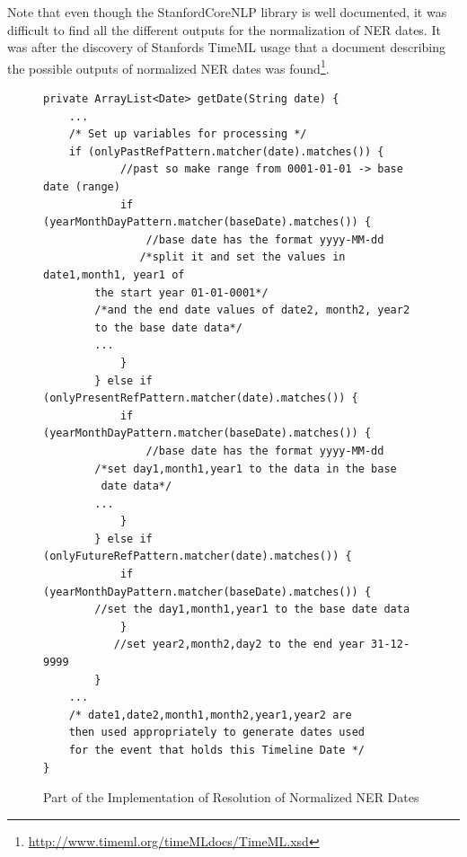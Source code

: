 \par Note that even though the StanfordCoreNLP library is well documented, it was difficult to find all the different outputs for the normalization of NER dates. It was after the discovery of Stanfords TimeML usage that a document describing the possible outputs of normalized NER dates was found\footnote{\url{http://www.timeml.org/timeMLdocs/TimeML.xsd}}. 

\begin{figure}[H]
\begin{lstlisting}
private ArrayList<Date> getDate(String date) {
	...
	/* Set up variables for processing */
	if (onlyPastRefPattern.matcher(date).matches()) {
            //past so make range from 0001-01-01 -> base date (range)
            if (yearMonthDayPattern.matcher(baseDate).matches()) {
                //base date has the format yyyy-MM-dd
               /*split it and set the values in date1,month1, year1 of 
		the start year 01-01-0001*/
		/*and the end date values of date2, month2, year2 
		to the base date data*/
		...
            }
        } else if (onlyPresentRefPattern.matcher(date).matches()) {
            if (yearMonthDayPattern.matcher(baseDate).matches()) {
                //base date has the format yyyy-MM-dd
		/*set day1,month1,year1 to the data in the base
		 date data*/
		...
            }
        } else if (onlyFutureRefPattern.matcher(date).matches()) {
            if (yearMonthDayPattern.matcher(baseDate).matches()) {
		//set the day1,month1,year1 to the base date data
            }
           //set year2,month2,day2 to the end year 31-12-9999
        }
	...
	/* date1,date2,month1,month2,year1,year2 are 
	then used appropriately to generate dates used 
	for the event that holds this Timeline Date */
}
\end{lstlisting}
\caption{Part of the Implementation of Resolution of Normalized NER Dates}
\label{fig:refCode}
\end{figure}

